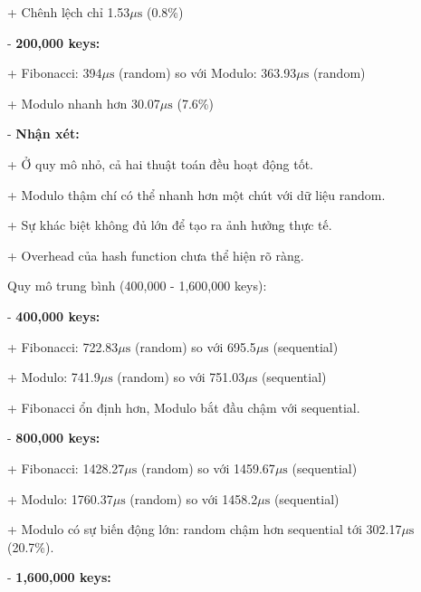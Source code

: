 \documentclass[12pt,a4paper]{report}
\begin{document}
        \hspace{1cm}+ Chênh lệch chỉ 1.53$\mu\text{s}$ (0.8\%)
        
    - \textbf{200,000 keys:}

       \hspace{1cm}+ Fibonacci: 394$\mu\text{s}$ (random) so với Modulo: 363.93$\mu\text{s}$ (random)
        
       \hspace{1cm}+ Modulo nhanh hơn 30.07$\mu\text{s}$ (7.6\%)


    - \textbf{Nhận xét:}

    \hspace{1cm}+ Ở quy mô nhỏ, cả hai thuật toán đều hoạt động tốt.
    
   \hspace{1cm}+ Modulo thậm chí có thể nhanh hơn một chút với dữ liệu random.
    
   \hspace{1cm}+ Sự khác biệt không đủ lớn để tạo ra ảnh hưởng thực tế.
    
    \hspace{1cm}+ Overhead của hash function chưa thể hiện rõ ràng.

Quy mô trung bình (400,000 - 1,600,000 keys):

    - \textbf{400,000 keys:}

        \hspace{1cm}+ Fibonacci: 722.83$\mu\text{s}$ (random) so với 695.5$\mu\text{s}$ (sequential)
        
        \hspace{1cm}+ Modulo: 741.9$\mu\text{s}$ (random) so với 751.03$\mu\text{s}$ (sequential)
        
        \hspace{1cm}+ Fibonacci ổn định hơn, Modulo bắt đầu chậm với sequential.

    - \textbf{800,000 keys:}

        \hspace{1cm}+ Fibonacci: 1428.27$\mu\text{s}$ (random) so với 1459.67$\mu\text{s}$ (sequential)
        
        \hspace{1cm}+ Modulo: 1760.37$\mu\text{s}$ (random) so với 1458.2$\mu\text{s}$ (sequential)
        
        \hspace{1cm}+ Modulo có sự biến động lớn: random chậm hơn sequential tới 302.17$\mu\text{s}$ (20.7\%).

    - \textbf{1,600,000 keys:}
\end{document}
